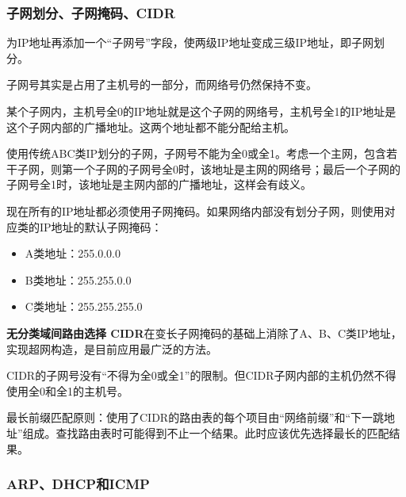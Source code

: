 \documentclass[12pt, a4paper, oneside]{ctexart}
\begin{document}
\subsubsection{子网划分、子网掩码、CIDR}

为IP地址再添加一个“子网号”字段，使两级IP地址变成三级IP地址，即子网划分。

子网号其实是占用了主机号的一部分，而网络号仍然保持不变。

某个子网内，主机号全0的IP地址就是这个子网的网络号，主机号全1的IP地址是这个子网内部的广播地址。这两个地址都不能分配给主机。

使用传统ABC类IP划分的子网，子网号不能为全0或全1。考虑一个主网，包含若干子网，则第一个子网的子网号全0时，该地址是主网的网络号；最后一个子网的子网号全1时，该地址是主网内部的广播地址，这样会有歧义。

现在所有的IP地址都必须使用子网掩码。如果网络内部没有划分子网，则使用对应类的IP地址的默认子网掩码：
\begin{itemize}
    \item A类地址：255.0.0.0
    \item B类地址：255.255.0.0
    \item C类地址：255.255.255.0
\end{itemize}

\textbf{无分类域间路由选择 CIDR}在变长子网掩码的基础上消除了A、B、C类IP地址，实现超网构造，是目前应用最广泛的方法。

CIDR的子网号没有“不得为全0或全1”的限制。但CIDR子网内部的主机仍然不得使用全0和全1的主机号。

最长前缀匹配原则：使用了CIDR的路由表的每个项目由“网络前缀”和“下一跳地址”组成。查找路由表时可能得到不止一个结果。此时应该优先选择最长的匹配结果。

\subsubsection{ARP、DHCP和ICMP}
\end{document}
